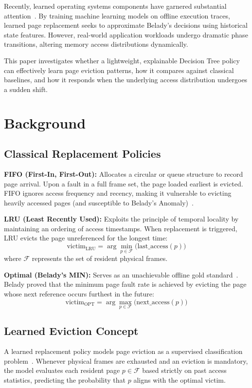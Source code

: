 \documentclass[10pt,twocolumn,a4paper]{article}
\begin{document}
Recently, learned operating systems components have garnered substantial attention~\cite{vietri2018lecar}. By training machine learning models on offline execution traces, learned page replacement seeks to approximate Belady's decisions using historical state features. However, real-world application workloads undergo dramatic phase transitions, altering memory access distributions dynamically. 

This paper investigates whether a lightweight, explainable Decision Tree policy can effectively learn page eviction patterns, how it compares against classical baselines, and how it responds when the underlying access distribution undergoes a sudden shift.

\section{Background}
\subsection{Classical Replacement Policies}
\textbf{FIFO (First-In, First-Out):} Allocates a circular or queue structure to record page arrival. Upon a fault in a full frame set, the page loaded earliest is evicted. FIFO ignores access frequency and recency, making it vulnerable to evicting heavily accessed pages (and susceptible to Belady's Anomaly)~\cite{silberschatz2018operating}.

\textbf{LRU (Least Recently Used):} Exploits the principle of temporal locality by maintaining an ordering of access timestamps. When replacement is triggered, LRU evicts the page unreferenced for the longest time:
\begin{equation}
\text{victim}_{\text{LRU}} = \arg\min_{p \in \mathcal{F}} \big( \text{last\_access}(p) \big)
\end{equation}
where $\mathcal{F}$ represents the set of resident physical frames.

\textbf{Optimal (Belady's MIN):} Serves as an unachievable offline gold standard~\cite{belady1966study}. Belady proved that the minimum page fault rate is achieved by evicting the page whose next reference occurs furthest in the future:
\begin{equation}
\text{victim}_{\text{OPT}} = \arg\max_{p \in \mathcal{F}} \big( \text{next\_access}(p) \big)
\end{equation}

\subsection{Learned Eviction Concept}
A learned replacement policy models page eviction as a supervised classification problem~\cite{vietri2018lecar,pedregosa2011scikit}. Whenever physical frames are exhausted and an eviction is mandatory, the model evaluates each resident page $p \in \mathcal{F}$ based strictly on past access statistics, predicting the probability that $p$ aligns with the optimal victim.
\end{document}
